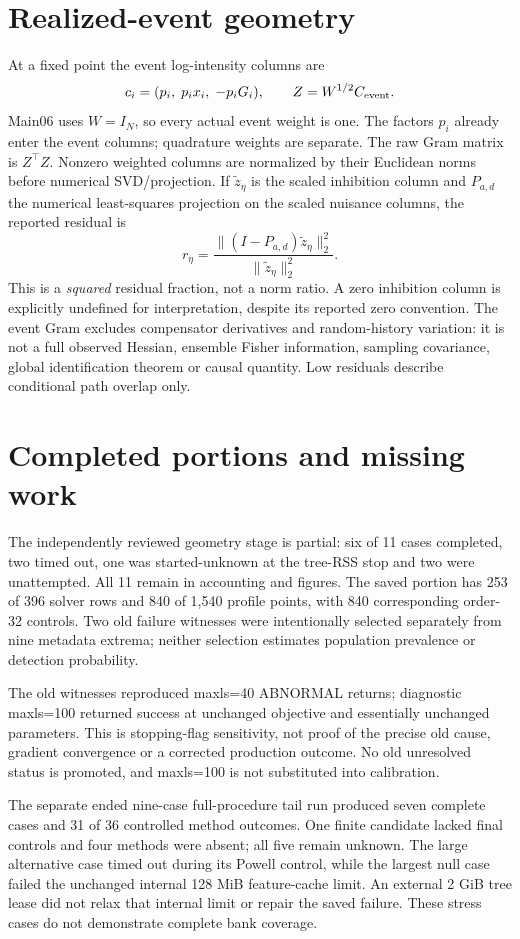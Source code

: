\documentclass[11pt]{article}
\begin{document}
\section*{Realized-event geometry}
At a fixed point the event log-intensity columns are
\[
 c_i=(p_i,\;p_i x_i,\;-p_iG_i),\qquad
 Z=W^{1/2}C_{\rm event} .
\]
Main06 uses $W=I_N$, so every actual event weight is one. The factors
$p_i$ already enter the event columns; quadrature weights are separate.
The raw Gram matrix is $Z^\top Z$. Nonzero weighted columns are normalized
by their Euclidean norms before numerical SVD/projection. If $\widetilde z_\eta$
is the scaled inhibition column and $P_{a,d}$ the numerical least-squares
projection on the scaled nuisance columns, the reported residual is
\[
 r_\eta=\frac{\|(I-P_{a,d})\widetilde z_\eta\|_2^2}
                  {\|\widetilde z_\eta\|_2^2} .
\]
This is a \emph{squared} residual fraction, not a norm ratio. A zero
inhibition column is explicitly undefined for interpretation, despite its
reported zero convention. The event Gram excludes compensator derivatives
and random-history variation: it is not a full observed Hessian, ensemble
Fisher information, sampling covariance, global identification theorem or
causal quantity. Low residuals describe conditional path overlap only.

\section*{Completed portions and missing work}
The independently reviewed geometry stage is partial: six of 11 cases
completed, two timed out, one was started-unknown at the tree-RSS stop and
two were unattempted. All 11 remain in accounting and figures. The saved
portion has 253 of 396 solver rows and 840 of 1,540 profile points, with
840 corresponding order-32 controls. Two old failure witnesses were
intentionally selected separately from nine metadata extrema; neither
selection estimates population prevalence or detection probability.

The old witnesses reproduced maxls=40 ABNORMAL returns; diagnostic
maxls=100 returned success at unchanged objective and essentially unchanged
parameters. This is stopping-flag sensitivity, not proof of the precise old
cause, gradient convergence or a corrected production outcome. No old
unresolved status is promoted, and maxls=100 is not substituted into calibration.

The separate ended nine-case full-procedure tail run produced seven complete
cases and 31 of 36 controlled method outcomes. One finite candidate lacked
final controls and four methods were absent; all five remain unknown.
The large alternative case timed out during its Powell control, while the
largest null case failed the unchanged internal 128 MiB feature-cache limit.
An external 2 GiB tree lease did not relax that internal limit or repair the
saved failure. These stress cases do not demonstrate complete bank coverage.
\end{document}
